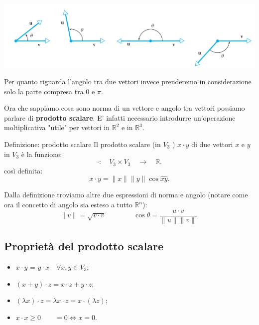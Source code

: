 \documentclass[x11names]{article}
\begin{document}
\begin{center}
\includegraphics[scale=0.25]{figures/angoli.png}
\end{center}
Per quanto riguarda l'angolo tra due vettori invece prenderemo in considerazione solo la parte compresa tra $0$ e $\pi$.


Ora che sappiamo cosa sono norma di un vettore e angolo tra vettori possiamo parlare di \textbf{prodotto scalare}. E' infatti necessario introdurre un'operazione moltiplicativa "utile" per vettori in $\mathbb{R}^2$ e in $\mathbb{R}^3$.

\begin{center}
\colorbox{myblue}{\begin{minipage}{5.75in}
\begin{blues}{Definizione: prodotto scalare}
Il prodotto scalare (in $V_3$ ) $x\cdot y$ di due vettori $x$ e $y$ in $V_3$ è la funzione:
\[
\cdot : \quad V_3 \times V_3 \quad \longrightarrow \quad \mathbb{R}
.\] 
così definita:
\[
x \cdot y  = \|x\| \|y\| \cos{\hat{xy}}
.\] 

\end{blues}
\end{minipage}}        
\end{center}

Dalla definizione troviamo altre due espressioni di norma e angolo (notare come ora il concetto di angolo sia esteso a tutto $\mathbb{R}^n$):
\[
\|v\| = \sqrt{v\cdot v} \qquad \qquad \cos{\theta} = \frac{u\cdot v}{\|u\|\|v\|}
.\]

\subsection{Proprietà del prodotto scalare}
\begin{itemize}
	\item $x \cdot y$ = $y \cdot x \quad \forall x,y \in V_3$;
	\item $\left(x + y\right)\cdot z = x\cdot z + y\cdot z$;
	\item $\left(\lambda x\right)\cdot z = \lambda x \cdot z = x \cdot \left(\lambda z\right)$;
	\item $x\cdot x \geq 0 \qquad = 0 \Longleftrightarrow x = 0$.
\end{itemize}
\end{document}
